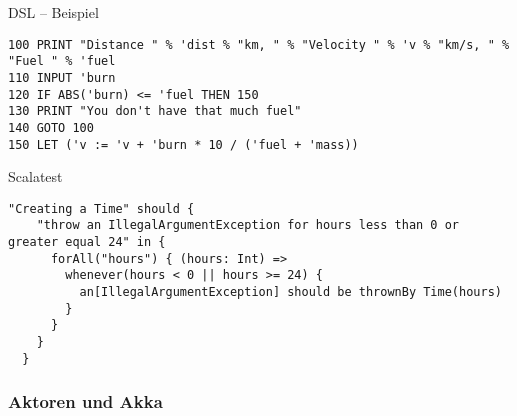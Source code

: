 \documentclass[14pt,aspectratio=169,trans]{beamer} %
\begin{document}
\begin{frame}[fragile]{}
 \begin{block}{DSL -- Beispiel}
\scriptsize
	\onslide<1->
  \begin{lstlisting}
100 PRINT "Distance " % 'dist % "km, " % "Velocity " % 'v % "km/s, " % "Fuel " % 'fuel
110 INPUT 'burn
120 IF ABS('burn) <= 'fuel THEN 150
130 PRINT "You don't have that much fuel"
140 GOTO 100
150 LET ('v := 'v + 'burn * 10 / ('fuel + 'mass))
	\end{lstlisting}
\end{block}
\end{frame}

\begin{frame}[fragile]{}
 \begin{block}{Scalatest}
\scriptsize
	\onslide<1->
  \begin{lstlisting}
"Creating a Time" should {
    "throw an IllegalArgumentException for hours less than 0 or greater equal 24" in {
      forAll("hours") { (hours: Int) =>
        whenever(hours < 0 || hours >= 24) {
          an[IllegalArgumentException] should be thrownBy Time(hours)
        }
      }
    }
  }
	\end{lstlisting}
\end{block}
\end{frame}

\subsubsection*{Aktoren und Akka}
\end{document}
